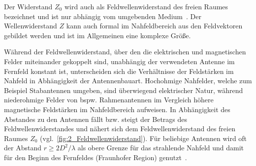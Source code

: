 Der Widerstand $Z_0$ wird auch als Feldwellenwiderstand des freien Raumes bezeichnet und ist nur abhängig vom umgebenden Medium~\cite{EMV}. Der Wellenwiderstand $Z$ kann auch formal im Nahfeldbereich aus den Feldvektoren gebildet werden und ist im Allgemeinen eine komplexe Größe.
\par
\vspace{\linespace}
Während der Feldwellenwiderstand, über den die elektrischen und magnetischen Felder miteinander gekoppelt sind, unabhängig der verwendeten Antenne im Fernfeld konstant ist, unterscheiden sich die Verhältnisse der Feldstärken im Nahfeld in Abhängigkeit der Antennenbauart. Hochohmige Nahfelder, welche zum Beispiel Stabantennen umgeben, sind überwiegend elektrischer Natur, während niederohmige Felder von bspw. Rahmenantennen im Vergleich höhere magnetische Feldstärken im Nahfeldbereich aufweisen. In Abhängigkeit des Abstandes zu den Antennen fällt bzw. steigt der Betrags des Feldwellenwiderstandes und nähert sich dem Feldwellenwiderstand des freien Raumes $Z_0$ (vgl.~\Abb \ref{fig:2_Feldwellenwiderstand}). Für beliebige Antennen wird oft der Abstand $r\geq 2 D^2 / \lambda$ als obere Grenze für das strahlende Nahfeld und damit für den Beginn des Fernfeldes (Fraunhofer Region) genutzt~\cite{Antenna_Theory}.  


